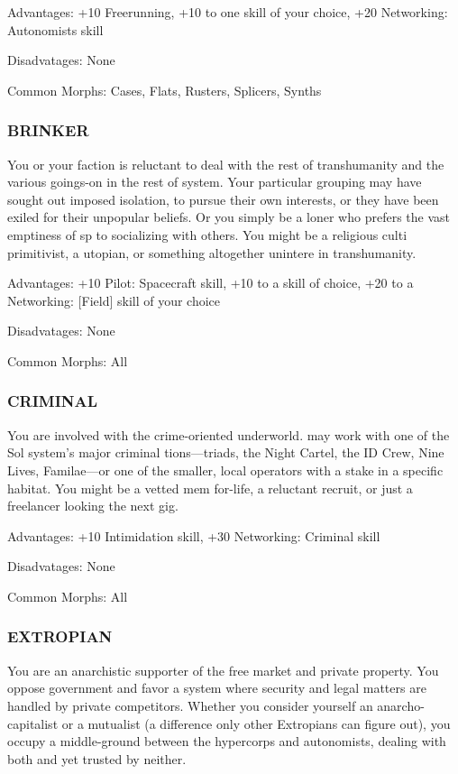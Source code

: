 Advantages: +10 Freerunning, +10 to one skill of your choice, +20 Networking:
Autonomists skill

Disadvatages: None

Common Morphs: Cases, Flats, Rusters, Splicers, Synths

\subsubsection{BRINKER}
You or your faction is reluctant to deal with the rest of transhumanity and the
various goings-on in the rest of system. Your particular grouping may have
sought out imposed isolation, to pursue their own interests, or they have been
exiled for their unpopular beliefs. Or you simply be a loner who prefers the
vast emptiness of sp to socializing with others. You might be a religious culti
primitivist, a utopian, or something altogether unintere in transhumanity.

Advantages: +10 Pilot: Spacecraft skill, +10 to a skill of choice, +20 to a
Networking: [Field] skill of your choice

Disadvatages: None

Common Morphs: All

\subsubsection{CRIMINAL}
You are involved with the crime-oriented underworld.  may work with one of the
Sol system’s major criminal tions—triads, the Night Cartel, the ID Crew, Nine
Lives, Familae—or one of the smaller, local operators with a stake in a
specific habitat. You might be a vetted mem for-life, a reluctant recruit, or
just a freelancer looking the next gig.

Advantages: +10 Intimidation skill, +30 Networking: Criminal skill

Disadvatages: None

Common Morphs: All

\subsubsection{EXTROPIAN}
You are an anarchistic supporter of the free market and private property. You
oppose government and favor a system where security and legal matters are
handled by private competitors. Whether you consider yourself an
anarcho-capitalist or a mutualist (a difference only other Extropians can
figure out), you occupy a middle-ground between the hypercorps and autonomists,
dealing with both and yet trusted by neither.

